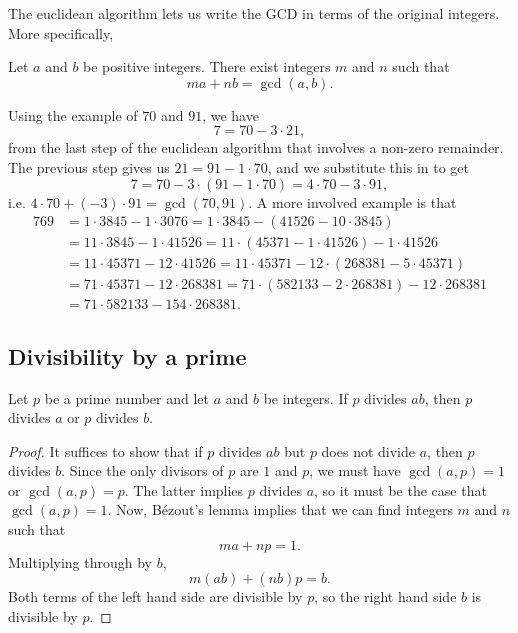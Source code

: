 The euclidean algorithm lets us write the GCD in terms of the original integers. More specifically,

\begin{lemma}[B\'{e}zout]\label{lem:bezout}
Let $a$ and $b$ be positive integers. There exist integers $m$ and $n$ such that
\begin{equation*}
ma + nb = \gcd(a,b).
\end{equation*}
\end{lemma}
Using the example of $70$ and $91$, we have
\begin{equation*}
7 = 70 - 3\cdot 21,
\end{equation*}
from the last step of the euclidean algorithm that involves a non-zero remainder. The previous step gives us $21 = 91 - 1\cdot 70$, and we substitute this in to get
\begin{equation*}
7 = 70 - 3\cdot (91 - 1\cdot 70) = 4\cdot 70 - 3\cdot 91,
\end{equation*}
i.e. $4\cdot 70 + (-3)\cdot 91 = \gcd(70,91)$. A more involved example is that
\begin{align*}
769 &= 1\cdot 3845 - 1\cdot 3076 = 1\cdot 3845 - (41526 - 10\cdot 3845) \\
&= 11\cdot 3845 - 1\cdot 41526 = 11\cdot (45371 - 1\cdot 41526) - 1\cdot 41526 \\
&= 11\cdot 45371 - 12\cdot 41526 = 11\cdot 45371 - 12\cdot (268381 - 5\cdot 45371) \\
&= 71\cdot 45371 - 12\cdot 268381 = 71\cdot (582133 - 2\cdot 268381) - 12\cdot 268381 \\
&= 71\cdot 582133 - 154\cdot 268381.
\end{align*}


\subsection{Divisibility by a prime}

\begin{proposition}\label{prop:prime}
Let $p$ be a prime number and let $a$ and $b$ be integers. If $p$ divides $ab$, then $p$ divides $a$ or $p$ divides $b$.
\end{proposition}
\begin{proof}
It suffices to show that if $p$ divides $ab$ but $p$ does not divide $a$, then $p$ divides $b$. Since the only divisors of $p$ are $1$ and $p$, we must have $\gcd(a,p) = 1$ or $\gcd(a,p) = p$. The latter implies $p$ divides $a$, so it must be the case that $\gcd(a,p) = 1$. Now, B\'{e}zout's lemma implies that we can find integers $m$ and $n$ such that
\begin{equation*}
ma + np = 1.
\end{equation*}
Multiplying through by $b$,
\begin{equation*}
m(ab) + (nb)p = b.
\end{equation*}
Both terms of the left hand side are divisible by $p$, so the right hand side $b$ is divisible by $p$.
\end{proof}

